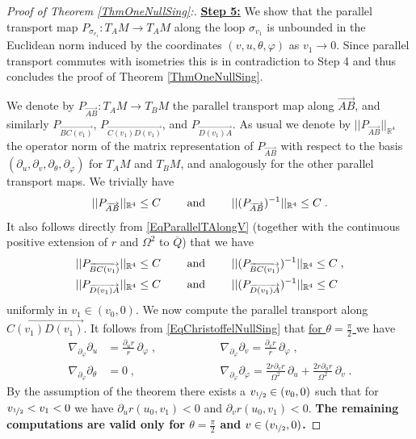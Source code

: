 \documentclass[reqno]{article}
\newcommand{\R}{\mathbb{R}}
\newcommand{\rd}{\partial}
\begin{document}
\begin{proof}[Proof of Theorem \ref{ThmOneNullSing}:]
\underline{\textbf{Step 5:}} We show that the parallel transport map $P_{{\sigma}_{v_1}} : T_{A} M \to T_A M$ along the loop $\sigma_{v_1}$ is unbounded in the Euclidean norm induced by the coordinates $(v,u, \theta, \varphi)$ as $v_1 \to 0$. Since parallel transport commutes with isometries this is in contradiction to Step 4 and thus concludes the proof of Theorem \ref{ThmOneNullSing}.
\newline

We denote by $P_{\overrightarrow{AB}} : T_AM \to T_BM$ the parallel transport map along $\overrightarrow{AB}$, and similarly $P_{\overrightarrow{BC(v_1)}}$, $P_{\overrightarrow{C(v_1)D(v_1)}}$, and $P_{\overrightarrow{D(v_1)A}}$. As usual we denote by $||P_{\overrightarrow{AB}}||_{\R^4}$ the operator norm of the matrix representation of $P_{\overrightarrow{AB}}$ with respect to the basis $(\partial_u, \partial_v, \partial_\theta, \partial_\varphi)$ for $T_AM$ and $T_BM$, and analogously for the other parallel transport maps. We trivially have
\begin{equation}
\label{EqPTAB}
||P_{\overrightarrow{AB}}||_{\R^4} \leq C  \qquad \textnormal{ and } \qquad ||(P_{\overrightarrow{AB}})^{-1}||_{\R^4} \leq C \;.
\end{equation}
It also follows directly from \eqref{EqParallelTAlongV} (together with the continuous positive extension of $r$ and $\Omega^2$ to $\overline{Q}$) that we have
\begin{equation}
\label{EqPTNULL}
\begin{split}
||P_{\overrightarrow{BC(v_1)}}||_{\R^4} \leq C  \qquad &\textnormal{ and } \qquad ||(P_{\overrightarrow{BC(v_1)}})^{-1}||_{\R^4} \leq C \;, \\
||P_{\overrightarrow{D(v_1)A}}||_{\R^4} \leq C  \qquad &\textnormal{ and } \qquad ||(P_{\overrightarrow{D(v_1)A}})^{-1}||_{\R^4} \leq C 
\end{split}
\end{equation}
uniformly in $v_1 \in (v_0, 0)$. We now compute the parallel transport along $\overrightarrow{C(v_1)D(v_1)}$. It follows from \eqref{EqChristoffelNullSing} that \underline{for $\theta = \frac{\pi}{2}$ } we have
\begin{equation} \label{EqPTPHI}
\begin{aligned}
\nabla_{\rd_\varphi} \rd_u &= \frac{\rd_u r}{r} \, \rd_\varphi\;, \qquad \qquad &&\nabla_{\rd_\varphi} \rd_v = \frac{\rd_v r}{r} \, \rd_\varphi \;,\\
\nabla_{\rd_\varphi} \rd_\theta &=0 \;,\qquad \qquad &&\nabla_{\rd_\varphi} \rd_{\varphi} = \frac{2r \rd_v r}{\Omega^2} \, \rd_u + \frac{2r \rd_u r}{\Omega^2} \, \rd_v \;.
\end{aligned}
\end{equation}
By the assumption of the theorem there exists a $v_{\nicefrac{1}{2}} \in (v_0, 0)$ such that for $v_{\nicefrac{1}{2}} < v_1 <0$ we have $\rd_u r(u_0, v_1) <0$ and $\rd_v r(u_0, v_1) < 0$.  \textbf{The remaining computations are valid only for $\theta = \frac{\pi}{2}$ and $v \in (v_{\nicefrac{1}{2}}, 0)$. }


\end{proof}
\end{document}
